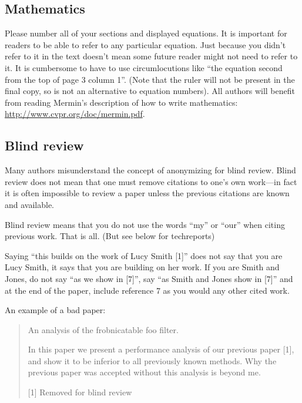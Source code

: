 \documentclass[10pt,twocolumn,letterpaper]{article}
\begin{document}
\subsection{Mathematics}

Please number all of your sections and displayed equations.  It is
important for readers to be able to refer to any particular equation.  Just
because you didn't refer to it in the text doesn't mean some future reader
might not need to refer to it.  It is cumbersome to have to use
circumlocutions like ``the equation second from the top of page 3 column
1''.  (Note that the ruler will not be present in the final copy, so is not
an alternative to equation numbers).  All authors will benefit from reading
Mermin's description of how to write mathematics: \url{http://www.cvpr.org/doc/mermin.pdf}.


\subsection{Blind review}

Many authors misunderstand the concept of anonymizing for blind
review.  Blind review does not mean that one must remove
citations to one's own work---in fact it is often impossible to
review a paper unless the previous citations are known and
available.

Blind review means that you do not use the words ``my'' or ``our''
when citing previous work.  That is all.  (But see below for 
techreports)

Saying ``this builds on the work of Lucy Smith [1]'' does not say
that you are Lucy Smith, it says that you are building on her
work.  If you are Smith and Jones, do not say ``as we show in
[7]'', say ``as Smith and Jones show in [7]'' and at the end of the
paper, include reference 7 as you would any other cited work.

An example of a bad paper:
\begin{quote}
\begin{center}
    An analysis of the frobnicatable foo filter. 
\end{center}
   
   In this paper we present a performance analysis of our
   previous paper [1], and show it to be inferior to all
   previously known methods.  Why the previous paper was
   accepted without this analysis is beyond me.
   
   [1] Removed for blind review
\end{quote}
   
\end{document}
